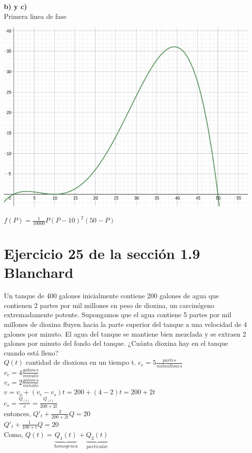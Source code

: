 \documentclass{article}
\numberwithin{equation}{section}
\theoremstyle{plain}  %
\begin{document}
        \textbf{b) y c)} \\ Primera linea de fase
        \begin{center}
            \includegraphics[scale=0.3]{1g.jpeg}
        \end{center}
        $f(P)=\frac{1}{10000}P(P-10)^{2}(50-P)$ 
\section{Ejercicio 25 de la sección 1.9 Blanchard}
Un tanque de 400 galones inicialmente 
contiene 200 galones de agua que contienen 2 
partes por mil millones en peso de dioxina, 
un carcinógeno extremadamente potente. 
Supongamos que el agua contiene
5 partes por mil millones de dioxina fluyen 
hacia la parte superior del tanque a una 
velocidad de 4 galones por minuto. 
El agua del tanque se mantiene bien 
mezclada y se extraen 2 galones por minuto del 
fondo del tanque. ¿Cuánta dioxina hay en el 
tanque cuando está lleno? \\ 
$Q(t)$ cantidad de dioxiona en un tiempo t. 
$c_{e} = 5 \frac{partes}{mil millones}$  \\ 
$v_{e} = 4 \frac{galones}{minuto}$ \\ 
$v_{s}=2 \frac{galones}{minuto}$ \\ 
$v = v_{o}+(v_{e}-v_{s})t=200+(4-2)t = 200 +2t$ \\ 
$c_{s}=\frac{Q_{(t)}}{v} = \frac{Q_{(t)}}{200+2t}$
\\ 
entonces, $Q'_{t}+\frac{2}{200+2t}Q=20$\\
$Q'_{t}+\frac{1}{100+t}Q=20$
\\
Como, $Q(t) =\underbrace{Q_{1}(t)}_{homogenea} +\underbrace{Q_{2}(t)}_{particular}$ 
\end{document}
